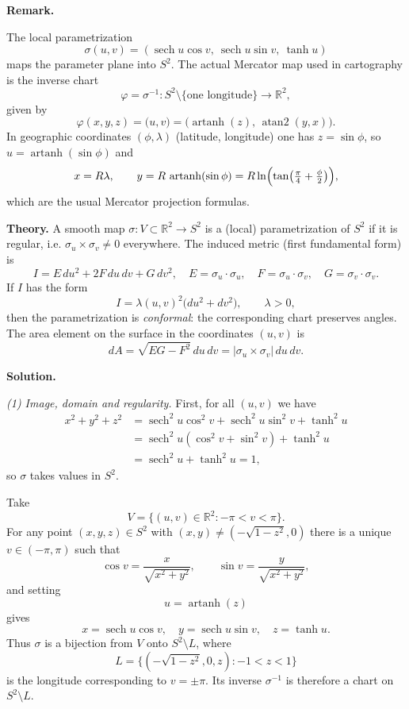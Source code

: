 \documentclass[12pt,a4paper]{article}
\theoremstyle{plain}
\theoremstyle{definition}      %
\begin{document}
\medskip
\textbf{Remark.}

The local parametrization
\[
\sigma(u,v) = (\operatorname{sech}u\cos v,\ \operatorname{sech}u\sin v,\ \tanh u)
\]
maps the parameter plane into $S^2$. The actual Mercator map used in
cartography is the inverse chart
\[
\varphi = \sigma^{-1}: S^2\setminus\{\text{one longitude}\}\to\mathbb{R}^2,
\]
given by
\[
\varphi(x,y,z) = \bigl(u,v\bigr)
= \bigl(\operatorname{artanh}(z),\,\operatorname{atan2}(y,x)\bigr).
\]
In geographic coordinates $(\phi,\lambda)$ (latitude, longitude) one has
$z=\sin\phi$, so $u=\operatorname{artanh}(\sin\phi)$ and
\[
x = R\lambda,\qquad y = R\,\operatorname{artanh}(\sin\phi)
= R\ln\Bigl(\tan\bigl(\tfrac{\pi}{4}+\tfrac{\phi}{2}\bigr)\Bigr),
\]
which are the usual Mercator projection formulas.


\medskip
\textbf{Theory.}
A smooth map $\sigma:V\subset\mathbb{R}^{2}\to S^{2}$ is a (local)
parametrization of $S^{2}$ if it is regular, i.e.
$\sigma_u\times\sigma_v\neq 0$ everywhere.
The induced metric (first fundamental form) is
\[
I = E\,du^{2} + 2F\,du\,dv + G\,dv^{2},
\quad
E = \sigma_u\cdot\sigma_u,\quad
F = \sigma_u\cdot\sigma_v,\quad
G = \sigma_v\cdot\sigma_v.
\]
If $I$ has the form
\[
I = \lambda(u,v)^{2}\big(du^{2}+dv^{2}\big),\qquad \lambda>0,
\]
then the parametrization is \emph{conformal}: the corresponding chart
preserves angles. The area element on the surface in the coordinates
$(u,v)$ is
\[
dA = \sqrt{EG-F^{2}}\,du\,dv = |\sigma_u\times\sigma_v|\,du\,dv.
\]

\medskip
\textbf{Solution.}

\emph{(1) Image, domain and regularity.}
First, for all $(u,v)$ we have
\[
\begin{aligned}
	x^{2}+y^{2}+z^{2}
	&= \operatorname{sech}^{2}u\cos^{2}v
	+ \operatorname{sech}^{2}u\sin^{2}v + \tanh^{2}u \\
	&= \operatorname{sech}^{2}u(\cos^{2}v+\sin^{2}v) + \tanh^{2}u \\
	&= \operatorname{sech}^{2}u + \tanh^{2}u = 1,
\end{aligned}
\]
so $\sigma$ takes values in $S^{2}$.

Take
\[
V = \{(u,v)\in\mathbb{R}^{2} : -\pi < v < \pi\}.
\]
For any point $(x,y,z)\in S^{2}$ with $(x,y)\neq(-\sqrt{1-z^{2}},0)$ there is a
unique $v\in(-\pi,\pi)$ such that
\[
\cos v = \frac{x}{\sqrt{x^{2}+y^{2}}},\qquad
\sin v = \frac{y}{\sqrt{x^{2}+y^{2}}},
\]
and setting
\[
u = \operatorname{artanh}(z)
\]
gives
\[
x = \operatorname{sech}u\cos v,\quad
y = \operatorname{sech}u\sin v,\quad
z = \tanh u.
\]
Thus $\sigma$ is a bijection from $V$ onto $S^{2}\setminus L$, where
\[
L = \{(-\sqrt{1-z^{2}},0,z) : -1<z<1\}
\]
is the longitude corresponding to $v=\pm\pi$.
Its inverse $\sigma^{-1}$ is therefore a chart on $S^{2}\setminus L$.
\end{document}

